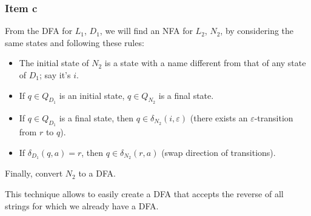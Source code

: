 \documentclass[docid=2018/19]{tcom_exam}
\begin{document}
{\subsubsection{Item c}
From the DFA for $L_1$, $D_1$, we will find an NFA for $L_2$, $N_2$, by considering the same states and following these rules:
\begin{itemize}
	\item The initial state of $N_2$ is a state with a name different from that of any state of $D_1$; say it's $i$.
	\item If $q \in Q_{D_1}$ is an initial state, $q \in Q_{N_2}$ is a final state.
	\item If $q \in Q_{D_1}$ is a final state, then $q \in \delta_{N_2}(i,\varepsilon)$ (there exists an $\varepsilon$-transition from $r$ to $q$).
	\item If $\delta_{D_1}(q,a)=r$, then $q \in \delta_{N_2}(r,a)$ (swap direction of transitions).
\end{itemize}
Finally, convert $N_2$ to a DFA.\par
This technique allows to easily create a DFA that accepts the reverse of all strings for which we already have a DFA.
}
\end{document}
